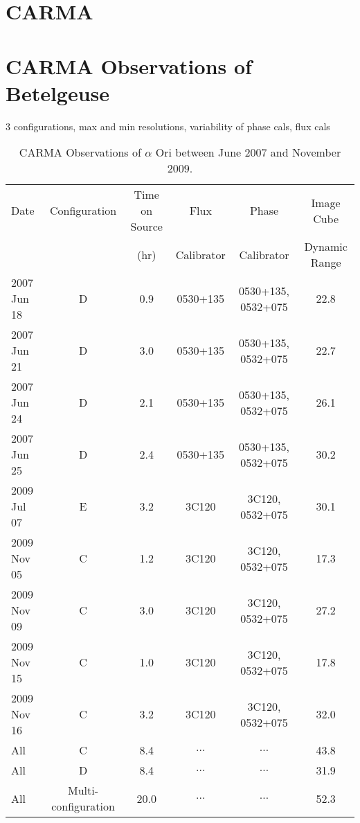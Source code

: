 \section{CARMA}\label{sec:3.2}


\section{CARMA Observations of Betelgeuse}\label{sec:3.3}
3 configurations, max and min resolutions, variability of phase cals, flux cals
\begin{landscape}
\begin{table}
\begin{center}
\caption[CARMA Observations of $\alpha$ Ori.]
{CARMA Observations of $\alpha$ Ori between June 2007 and November 2009.}
\begin{tabular}{lccccc}
\hline
\hline
\rule{0pt}{2.5ex}Date & Configuration & Time on Source & Flux		& Phase 	& Image Cube \\
	 & 				 &  (hr)		  & Calibrator	& Calibrator& Dynamic Range \\
\hline
\rule{0pt}{2.5ex}2007 Jun 18 	& D & 0.9 & 0530+135	& 0530+135, 0532+075 	&  22.8 \\
2007 Jun 21 	& D & 3.0 & 0530+135	& 0530+135, 0532+075 	&  22.7 \\
2007 Jun 24 	& D & 2.1 & 0530+135	& 0530+135, 0532+075 	&  26.1 \\
2007 Jun 25 	& D & 2.4 & 0530+135	& 0530+135, 0532+075 	&  30.2 \\
2009 Jul 07	& E & 3.2 & 3C120 		& 3C120, 0532+075	& 30.1 \\
2009 Nov 05	& C & 1.2 & 3C120 		& 3C120, 0532+075 	& 17.3 \\
2009 Nov 09 	& C & 3.0 & 3C120 		& 3C120, 0532+075 	& 27.2 \\
2009 Nov 15	& C & 1.0 & 3C120 		& 3C120, 0532+075 	& 17.8 \\
2009 Nov 16	& C & 3.2 & 3C120 		& 3C120, 0532+075 	& 32.0  \\
All		& C & 8.4	&  $\dots$	& 	$\dots$	& 43.8 \\
All 		& D & 8.4 &  $\dots$	&  	$\dots$	& 31.9 \\
All 		& Multi-configuration & 20.0 & $\dots$& $\dots$ 	& 52.3 \\
\hline
\end{tabular}
\label{tab:1}
\end{center}
\end{table}
\end{landscape}

